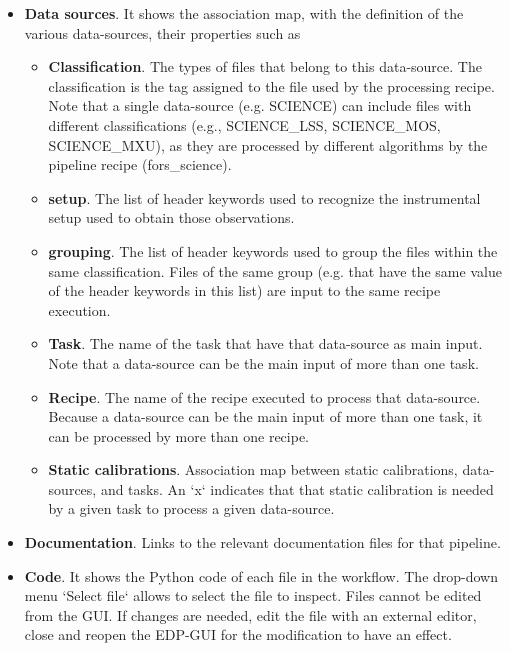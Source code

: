\begin{itemize}
\item {\bf Data sources}. It shows the association map, with the definition of the various data-sources, their properties
  such as

\begin{itemize}
    \item {\bf Classification}. The types of files that belong to this
      data-source. The classification is the tag assigned to the file
      used by the processing recipe. Note that a single data-source
      (e.g. SCIENCE) can include files with different classifications
      (e.g., SCIENCE\_LSS, SCIENCE\_MOS, SCIENCE\_MXU), as they are
      processed by different algorithms by the pipeline recipe (fors\_science).

    \item {\bf setup}. The list of header keywords used to recognize the
      instrumental setup used to obtain those observations.

    \item {\bf grouping}. The list of header keywords used to group the files
      within the same classification. Files of the same group (e.g. that
      have the same value of the header keywords in this list) are input
      to the same recipe execution.

    \item {\bf Task}. The name of the task that have that data-source as main
      input. Note that a data-source can be the main input of more than
      one task.

    \item {\bf Recipe}. The name of the recipe executed to process that
      data-source. Because a data-source can be the main input of more
      than one task, it can be processed by more than one recipe.

    \item {\bf Static calibrations}. Association map between static
      calibrations, data-sources, and tasks. An `x` indicates that that
      static calibration is needed by a given task to process a given
      data-source.
\end{itemize}

\item {\bf Documentation}. Links to the relevant documentation files for
  that pipeline.

\item {\bf Code}. It shows the Python code of each file in the
  workflow. The drop-down menu `Select file` allows to select the
  file to inspect. Files cannot be edited from the GUI. If changes are needed, edit the file with an external editor, 
  close and reopen the EDP-GUI for the modification to have an effect.

  \end{itemize}